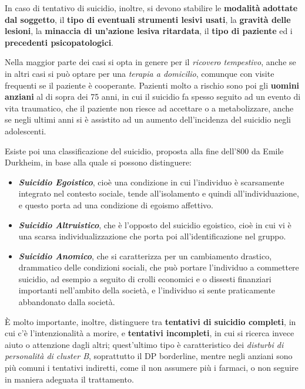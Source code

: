 In caso di tentativo di suicidio, inoltre, si devono stabilire le
\textbf{modalità} \textbf{adottate dal soggetto}, il \textbf{tipo di
eventuali strumenti lesivi usati}, la \textbf{gravità delle lesioni}, la
\textbf{minaccia di un'azione lesiva ritardata}, il \textbf{tipo di
paziente} ed i \textbf{precedenti psicopatologici}.

Nella maggior parte dei casi si opta in genere per il \emph{ricovero
tempestivo}, anche se in altri casi si può optare per una \emph{terapia
a domicilio}, comunque con visite frequenti se il paziente è cooperante.
Pazienti molto a rischio sono poi gli \textbf{uomini} \textbf{anziani}
al di sopra dei 75 anni, in cui il suicidio fa spesso seguito ad un
evento di vita traumatico, che il paziente non riesce ad accettare o a
metabolizzare, anche se negli ultimi anni si è assistito ad un aumento
dell'incidenza del suicidio negli adolescenti.

Esiste poi una classificazione del suicidio, proposta alla fine dell'800
da Emile Durkheim, in base alla quale si possono distinguere:

\begin{itemize}
\item
  \textbf{\emph{Suicidio Egoistico}}, cioè una condizione in cui
  l'individuo è scarsamente integrato nel contesto sociale, tende
  all'isolamento e quindi all'individuazione, e questo porta ad una
  condizione di egoismo affettivo.
\item
  \textbf{\emph{Suicidio Altruistico}}, che è l'opposto del suicidio
  egoistico, cioè in cui vi è una scarsa individualizzazione che porta
  poi all'identificazione nel gruppo.
\item
  \textbf{\emph{Suicidio Anomico}}, che si caratterizza per un
  cambiamento drastico, drammatico delle condizioni sociali, che può
  portare l'individuo a commettere suicidio, ad esempio a seguito di
  crolli economici e o dissesti finanziari importanti nell'ambito della
  società, e l'individuo si sente praticamente abbandonato dalla
  società.
\end{itemize}

È molto importante, inoltre, distinguere tra \textbf{tentativi di
suicidio completi}, in cui c'è l'intenzionalità a morire, e
\textbf{tentativi incompleti}, in cui si ricerca invece aiuto o
attenzione dagli altri; quest'ultimo tipo è caratteristico dei
\emph{disturbi di personalità di cluster B}, soprattutto il DP
borderline, mentre negli anziani sono più comuni i tentativi indiretti,
come il non assumere più i farmaci, o non seguire in maniera adeguata il
trattamento.
